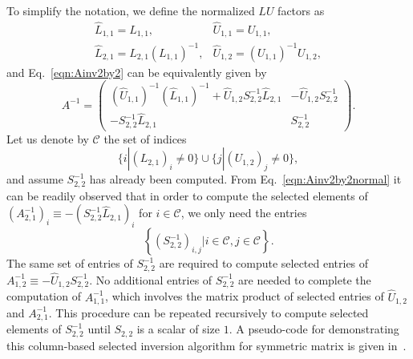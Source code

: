 \documentclass{acm_proc_article-sp}
\newcommand{\CS}{\ensuremath{\mathcal C}\xspace}
\begin{document}
To simplify the notation, we define the normalized $LU$ factors as
\begin{equation}
  \begin{array}{ll}
	\hat{L}_{1,1} = L_{1,1}, & \hat{U}_{1,1}=U_{1,1},\\
	\hat{L}_{2,1} = L_{2,1}(L_{1,1})^{-1}, & \hat{U}_{1,2} = (U_{1,1})^{-1}
	U_{1,2},
  \end{array}
	\label{}
\end{equation}
and Eq.~\eqref{eqn:Ainv2by2} can be equivalently given by 
\begin{equation}
	A^{-1} = \begin{pmatrix}
    (\hat{U}_{1,1})^{-1} (\hat{L}_{1,1})^{-1} + \hat{U}_{1,2}
    S_{2,2}^{-1}
		\hat{L}_{2,1} & - \hat{U}_{1,2} S_{2,2}^{-1} \\
		-S_{2,2}^{-1} \hat{L}_{2,1}  & S_{2,2}^{-1}
	\end{pmatrix}.
	\label{eqn:Ainv2by2normal}
\end{equation}
Let us denote by $\CS$ the set of indices
\begin{equation}
	\{i|\left(L_{2,1}\right)_{i} \ne 0\} \cup 
	\{j|\left(U_{1,2}\right)_{j} \ne 0\},
	\label{}
\end{equation} 
and assume $S_{2,2}^{-1}$ has already been computed. 
From Eq.~\eqref{eqn:Ainv2by2normal} it can be readily observed that
in order to compute the selected elements of 
$\left(A_{2,1}^{-1}\right)_{i} \equiv -\left( S^{-1}_{2,2}
\hat{L}_{2,1} \right)_{i}$ for $i\in \CS$,  
we only need the entries 
\begin{equation}
\left\{\left( S_{2,2}^{-1} \right)_{i,j} | i\in \CS, j\in \CS\right\}.
	\label{eqn:selectentry2x2}
\end{equation}
The same set of entries of $S_{2,2}^{-1}$ are required to compute 
selected entries of $A_{1,2}^{-1} \equiv -\hat{U}_{1,2}
S^{-1}_{2,2}$. 
No additional entries of $S_{2,2}^{-1}$ are needed to complete
the computation of $A_{1,1}^{-1}$, which involves the matrix product 
of selected entries of $\hat{U}_{1,2}$ and $A_{2,1}^{-1}$.
This procedure can be repeated recursively to compute selected elements
of $S_{2,2}^{-1}$ until $S_{2,2}$ is a scalar of size $1$. A pseudo-code for
demonstrating this column-based selected inversion algorithm for symmetric matrix is
given in~\cite{LinYangMezaEtAl2011}.
\end{document}
